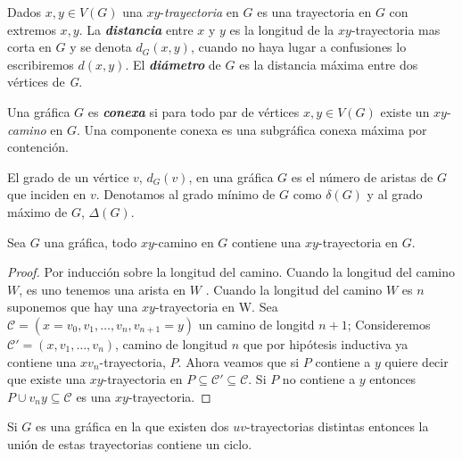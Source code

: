 \begin{definicion}
\end{definicion}

Dados $x,y \in V(G)$ una $xy$-\emph{trayectoria} en $G$ es una trayectoria
en $G$ con extremos $x,y$. La \textbf{\textit{distancia}} entre $x$ y $y$ es la longitud de
la $xy$-trayectoria mas corta en $G$ y se denota $d_G(x,y)$, cuando no haya lugar a confusiones lo escribiremos $d(x,
y)$. El \textbf{\textit{di\'ametro}} de $G$ es la distancia m\'axima entre dos v\'ertices
de \emph{G}.

\begin{definicion}
    Una gr\'afica $G$ es \textbf{\textit{conexa}} si para todo par de v\'ertices $x,y \in V
    (G)$ existe un $xy$-\emph{camino} en $G$. Una componente conexa es una subgr\'afica conexa m\'axima por
    contenci\'on.
\end{definicion}

El grado de un v\'ertice $v$, $d_G(v)$, en una gr\'afica $G$ es el n\'umero de aristas de $G$ que inciden en $v$.
Denotamos al grado m\'inimo de $G$ como $\delta(G)$ y al grado m\'aximo de $G$, $\Delta(G)$.

\begin{proposicion}
    Sea $G$ una gr\'afica, todo $xy$-camino en $G$ contiene una $xy$-trayectoria en $G$.
\end{proposicion}


\begin{proof}
    Por inducci\'on sobre la longitud del camino. Cuando la longitud del camino $W$, es uno tenemos una arista en $W$
    . Cuando la longitud del camino $W$ es $n$ suponemos que hay una $xy$-trayectoria en W. Sea $\mathscr{C} =
    (x=v_0, v_1, \dots, v_n,  v_{n+1}=y)$ un camino de longitd $n+1$; Consideremos $\mathscr{C'} = (x, v_1, \dots,
    v_n)$, camino de longitud $n$ que por hip\'otesis inductiva ya contiene una $xv_n$-trayectoria, $P$. Ahora veamos
    que si $P$ contiene a $y$ quiere decir que existe una $xy$-trayectoria en $P \subseteq \mathscr{C'} \subseteq
    \mathscr{C}$. Si $P$ no contiene a $y$ entonces $P \cup v_ny \subseteq \mathscr{C}$ es una $xy$-trayectoria.
\end{proof}

\begin{proposicion}
    Si  $G$ es una gr\'afica en la que existen dos $uv$-trayectorias distintas entonces la uni\'on de estas
    trayectorias contiene un ciclo.
\end{proposicion}


